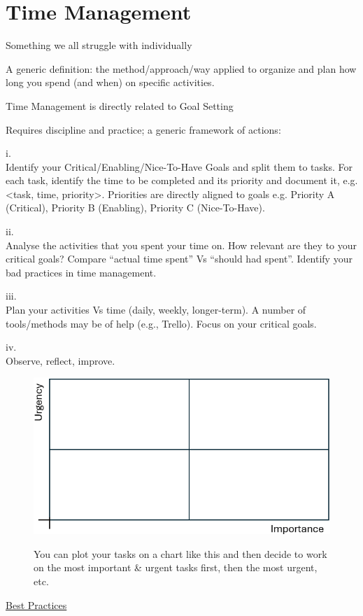 \documentclass[]{project_plan}
\begin{document}
\section{Time Management}

Something we all struggle with individually

A generic definition: the method/approach/way applied to organize and plan
how long you spend (and when) on specific activities.

Time Management is directly related to Goal Setting

\newpage

Requires discipline and practice; a generic framework of actions:

i.\\
Identify your Critical/Enabling/Nice-To-Have Goals and split them to tasks. For each task, identify
the time to be completed and its priority and document it, e.g. <task, time, priority>. Priorities are
directly aligned to goals e.g. Priority A (Critical), Priority B (Enabling), Priority C (Nice-To-Have).

ii.\\
Analyse the activities that you spent your time on. How relevant are they to your critical goals?
Compare “actual time spent”  Vs “should had spent”. Identify your bad practices in time
management.

iii.\\
Plan your activities Vs time (daily, weekly, longer-term). A number of tools/methods may be of
help (e.g., Trello). Focus on your critical goals.

iv.\\
Observe, reflect, improve.

\begin{figure}[H]
  \centering
  \includegraphics[width=.5\linewidth]{urgencyImportanceChart.png}

  You can plot your tasks on a chart like this and then decide to work on the most important \& urgent tasks first, then the most urgent, etc.
\end{figure}

\underline{Best Practices}
\end{document}
